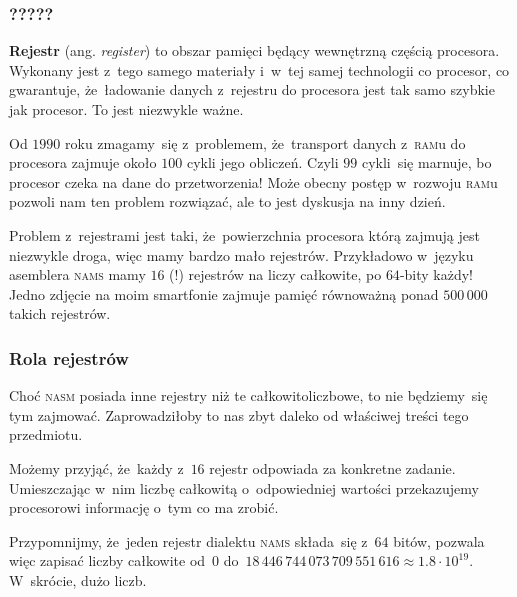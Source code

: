 \documentclass[10pt,t]{beamer}
\begin{document}
\begin{frame}
  \frametitle{?????}


  \textbf{Rejestr} (ang. \textit{register}) to obszar pamięci będący
  \alert{wewnętrzną} częścią procesora. Wykonany jest z~tego samego
  materiały i~w~tej samej technologii co procesor, co gwarantuje,
  że~ładowanie danych z~rejestru do procesora jest tak samo szybkie jak
  procesor. \alert{To jest niezwykle ważne.}

  Od $1990$ roku zmagamy~się z~problemem, że~transport danych
  z~\textsc{ram}u do procesora zajmuje około $100$ cykli jego obliczeń.
  Czyli $99$ cykli~się marnuje, bo procesor czeka na dane do przetworzenia!
  Może obecny postęp w~rozwoju \textsc{ram}u pozwoli nam ten problem
  rozwiązać, ale to jest dyskusja na inny dzień.

  Problem z~rejestrami jest taki, że~powierzchnia procesora którą zajmują
  jest niezwykle droga, więc mamy \alert{bardzo mało} rejestrów.
  Przykładowo w~języku asemblera \textsc{nams} mamy $16$ (!) rejestrów
  na liczy całkowite, po $64$-bity każdy! Jedno zdjęcie na moim smartfonie
  zajmuje pamięć równoważną ponad $500 \, 000$ takich rejestrów.

\end{frame}





\begin{frame}
  \frametitle{Rola rejestrów}


  Choć \textsc{nasm} posiada inne rejestry niż te całkowitoliczbowe, to nie
  będziemy~się tym zajmować. Zaprowadziłoby to nas zbyt daleko od właściwej
  treści tego przedmiotu.

  Możemy przyjąć, że~każdy z~$16$ rejestr odpowiada za konkretne zadanie.
  Umieszczając w~nim liczbę całkowitą o~odpowiedniej wartości przekazujemy
  procesorowi informację o~tym co ma zrobić.

  Przypomnijmy, że~jeden rejestr dialektu \textsc{nams} składa~się z~$64$
  bitów, pozwala więc zapisać liczby całkowite od~$0$
  do~$18 \, 446 \, 744 \, 073 \, 709 \, 551 \, 616 \approx 1.8 \cdot 10^{ 19 }$.
  W~skrócie, dużo liczb.

\end{frame}
\end{document}
